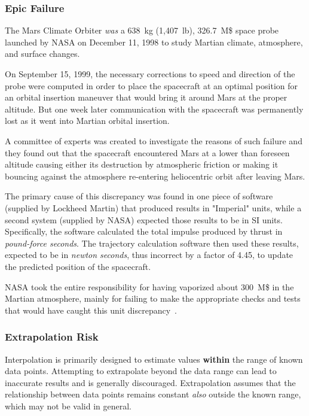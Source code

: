 \begin{curiosity}
\subsubsection{Epic Failure}
The Mars Climate Orbiter \emph{was} a 638~kg (1,407~lb), 326.7~M\$ space probe launched by NASA on December 11, 1998 to study Martian climate, atmosphere, 
and surface changes. 

On September 15, 1999, the necessary corrections to speed and direction of the probe were computed in order to place the spacecraft at an optimal position 
for an orbital insertion maneuver that would bring it around Mars at the proper altitude. 
But one week later communication with the spacecraft was permanently lost as it went into Martian orbital insertion. 

A committee of experts was created to investigate the reasons of 
such failure and they found out that the spacecraft encountered Mars at a lower than foreseen altitude causing either its destruction by atmospheric 
friction or making it bouncing against the atmosphere re-entering heliocentric orbit after leaving Mars.

The primary cause of this discrepancy was found in one piece of software (supplied by Lockheed Martin) that produced results in "Imperial" units, 
while a second system (supplied by NASA) expected those results to be in SI units. Specifically, the software calculated the total impulse produced by 
thrust in \emph{pound-force seconds}. The trajectory calculation software then used these results, expected to be in \emph{newton seconds}, thus 
incorrect by a factor of 4.45, to update the predicted position of the spacecraft.
	
NASA took the entire responsibility for having vaporized about 300~M\$ in the Martian atmosphere, mainly for failing to make the appropriate checks and 
tests that would have caught this unit discrepancy~\cite{bib:mars}.	
\end{curiosity}

\subsubsection{Extrapolation Risk}

Interpolation is primarily designed to estimate values \textbf{within} the range of known data points. Attempting to extrapolate beyond the data range 
can lead to inaccurate results and is generally discouraged. Extrapolation assumes that the relationship between data points remains constant \emph{also} outside 
the known range, which may not be valid in general.

